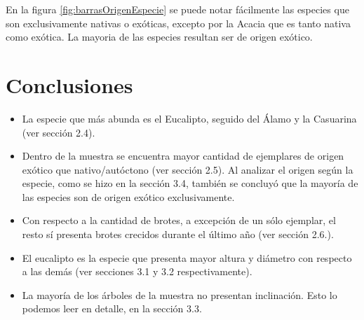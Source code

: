 \documentclass[11pt]{article}
\begin{document}
\begin{justify}
  En la figura \ref{fig:barrasOrigenEspecie} se puede notar fácilmente
  las especies que son exclusivamente nativas o exóticas, excepto por la Acacia
  que es tanto nativa como exótica. La mayoria de las especies resultan ser
  de origen exótico.
\end{justify}


\section{Conclusiones}

\begin{itemize}
  \item La especie que más abunda es el Eucalipto, seguido del Álamo y la Casuarina
        (ver sección 2.4).
  \item Dentro de la muestra se encuentra mayor cantidad de ejemplares de origen
        exótico que nativo/autóctono (ver sección 2.5). Al analizar el origen
        según la especie, como se hizo en la sección 3.4, también se concluyó
        que la mayoría de las especies son de origen exótico exclusivamente.
  \item Con respecto a la cantidad de brotes, a excepción de un sólo ejemplar, el
        resto sí presenta brotes crecidos durante el último año (ver sección 2.6.).
  \item El eucalipto es la especie que presenta mayor altura y diámetro con
        respecto a las demás (ver secciones 3.1 y 3.2 respectivamente).
  \item La mayoría de los árboles de la muestra no presentan inclinación. Esto
        lo podemos leer en detalle, en la sección 3.3.
\end{itemize}
\end{document}
